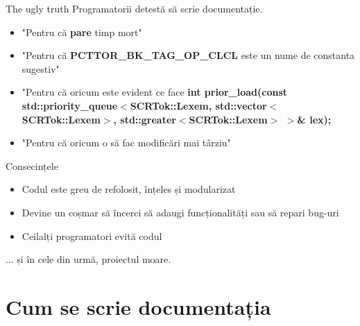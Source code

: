 \documentclass{beamer}
\begin{document}
\begin{frame}{The ugly truth}
	Programatorii detestă să scrie documentație.
	\pause
	\begin{itemize}
		\item "Pentru că {\bf pare} timp mort"
		\pause
		\item "Pentru că {\bf PCTTOR\_BK\_TAG\_OP\_CLCL} este un nume de constanta sugestiv"
		\pause
		\item "Pentru că oricum este evident ce face {\bf int prior\_load(const std::priority\_queue$<$SCRTok::Lexem, std::vector$<$SCRTok::Lexem$>$, std::greater$<$SCRTok::Lexem$>$ $>$\& lex);}
		\pause
		\item "Pentru că oricum o să fac modificări mai târziu"
		\pause
	\end{itemize}
\end{frame}

\begin{frame}{Consecințele}
  \begin{itemize}
  \pause
  \item Codul este greu de refolosit, înțeles și modularizat
  \pause
  \item Devine un coșmar să încerci să adaugi funcționalități sau să repari bug-uri
  \pause
  \item Ceilalți programatori evită codul
  \end{itemize}
  \pause
  ... și în cele din urmă, proiectul moare.
\end{frame}

\section{Cum se scrie documentația}
\end{document}
